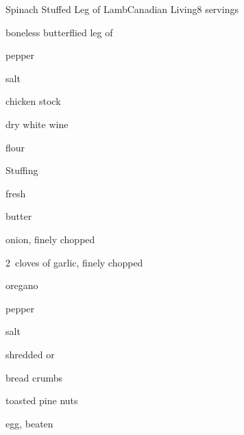 \begin{recipe}{Spinach Stuffed Leg of Lamb}{Canadian Living}{8 servings}

\begin{ingredients}
\item {} boneless butterflied leg of 
\item \tp{\half} pepper
\item \tp{\quarter} salt
\item {} chicken stock
\item \C{\quarter} dry white wine
\item {} flour
\end{ingredients}

Stuffing
\begin{ingredients}
\item {} fresh 
\item {} butter
\item onion, finely chopped
\item 2~cloves of garlic, finely chopped
\item {} oregano
\item \tp{\half} pepper
\item \tp{\quarter} salt
\item \C{\half} shredded  or 
\item \C{\half} bread crumbs
\item \C{\third} toasted pine nuts
\item egg, beaten
\end{ingredients}


\end{recipe}
